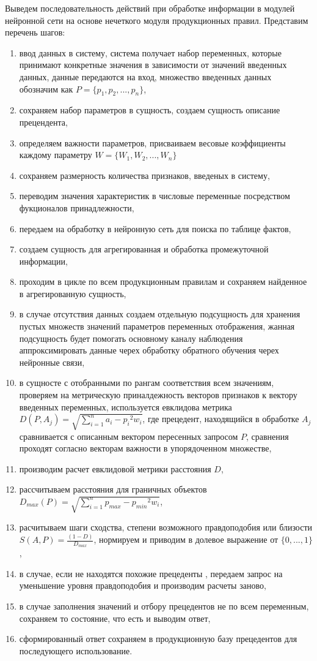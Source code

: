 Выведем последовательность действий при обработке информации в модулей нейронной сети на основе нечеткого модуля продукционных правил. Представим перечень шагов:
\begin{enumerate}
    \item ввод данных в систему, система получает набор переменных, которые принимают конкретные значения в зависимости от значений введенных данных, данные передаются на вход, множество введенных данных обозначим как $P =\{p_1, p_2, ..., p_n\}$,
    \item сохраняем набор параметров в сущность, создаем сущность описание прецендента,
    \item определяем важности параметров, присваиваем весовые коэффициенты каждому параметру $W = \{W_1, W_2, ..., W_n\}$
    \item сохраняем размерность количества признаков, введеных в систему,
    \item переводим значения характеристик в числовые переменные посредством фукционалов принадлежности,
    \item передаем на обработку в нейронную сеть для поиска по таблице фактов,
    \item создаем сущность для агрегированная и обработка промежуточной информации, 
    \item проходим в цикле по всем продукционным правилам и сохраняем найденное в агрегированную сущность,
    \item в случае отсутствия данных создаем отдельную подсущность для хранения пустых множеств значений параметров переменных отображения, жанная подсущность будет помогать основному каналу наблюдения аппроксимировать данные черех обработку обратного обучения черех нейронные связи,
    \item в сущносте с отобранными по рангам соответствия всем значениям, проверяем на метрическую приналдежность векторов признаков к вектору введенных переменных, используется евклидова метрика $D(P,A_j) = \sqrt{\sum_{i=1}^n{a_i - p_i}^2w_i}$, где прецедент, находящийся в обработке $A_j$ сравнивается с описанным вектором пересенных запросом $P$, сравнения проходят согласно векторам важности в упорядоченном множестве,
    \item производим расчет евклидовой метрики расстояния $D$, 
    \item рассчитываем расстояния для граничных объектов $D_{max}(P) = \sqrt{\sum_{i=1}^n{p_{max} - p_{min}}^2w_i}$,
    \item расчитываем шаги сходства, степени возможного правдоподобия или близости $S(A,P) = \frac{(1-D)}{D_{max}}$, нормируем и приводим в долевое выражение от $\{0, ..., 1\}$,
    \item в случае, если не находятся похожие прецеденты , передаем запрос на уменьшение уровня правдоподобия и производим расчеты заново,
    \item в случае заполнения значений и отбору прецедентов не по всем переменным, сохраняем то состояние, что есть и выводим ответ,
    \item сформированный ответ сохраняем в продукционную базу прецедентов для последующего использование.
\end{enumerate}

